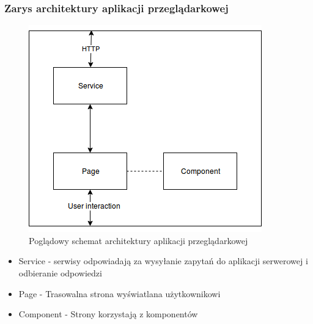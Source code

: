 \documentclass[polish,12pt]{aghthesis}
\begin{document}
\subsubsection{Zarys architektury aplikacji przeglądarkowej}
\begin{figure}[H]
\includegraphics[width=\textwidth]{front-schema}
\caption{Poglądowy schemat architektury aplikacji przeglądarkowej}
\end{figure}
\begin{itemize}
    \item Service - serwisy odpowiadają za wysyłanie zapytań do aplikacji serwerowej i odbieranie odpowiedzi
    \item Page - Trasowalna strona wyświatlana użytkownikowi
    \item Component - Strony korzystają z komponentów
\end{itemize}
\end{document}
